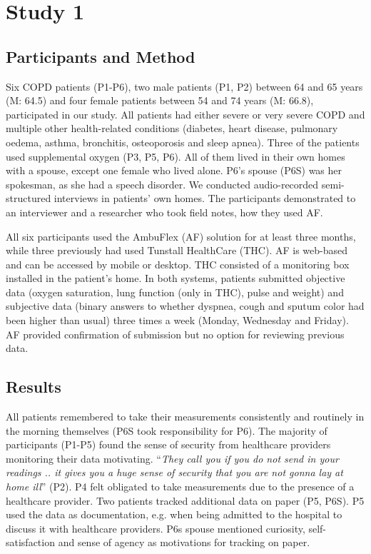 \section{Study 1}

\subsection{Participants and Method}
Six COPD patients (P1-P6), two male patients (P1, P2) between 64 and 65 years (M: 64.5) and four female patients between 54 and 74 years (M: 66.8), participated in our study. All patients had either severe or very severe COPD and multiple other health-related conditions (diabetes, heart disease, pulmonary oedema, asthma, bronchitis, osteoporosis and sleep apnea). Three of the patients used supplemental oxygen (P3, P5, P6). All of them lived in their own homes with a spouse, except one female who lived alone. P6’s spouse (P6S) was her spokesman, as she had a speech disorder. We conducted audio-recorded semi-structured interviews in patients’ own homes. The participants demonstrated to an interviewer and a researcher who took field notes, how they used AF. 

All six participants used the AmbuFlex (AF) solution for at least three months, while three previously had used Tunstall HealthCare (THC). AF is web-based and can be accessed by mobile or desktop. THC consisted of a monitoring box installed in the patient’s home. In both systems, patients submitted objective data (oxygen saturation, lung function (only in THC), pulse and weight) and subjective data (binary answers to whether dyspnea, cough and sputum color had been higher than usual) three times a week (Monday, Wednesday and Friday). AF provided confirmation of submission but no option for reviewing previous data. %

\subsection{Results}
All patients remembered to take their measurements consistently and routinely in the morning themselves (P6S took responsibility for P6). The majority of participants (P1-P5) found the sense of security from healthcare providers monitoring their data motivating. “\textit{They call you if you do not send in your readings .. it gives you a huge sense of security that you are not gonna lay at home ill}” (P2). P4 felt obligated to take measurements due to the presence of a healthcare provider. Two patients tracked additional data on paper (P5, P6S). P5 used the data as documentation, e.g. when being admitted to the hospital to discuss it with healthcare providers. P6s spouse mentioned curiosity, self-satisfaction and sense of agency as motivations for tracking on paper. 


